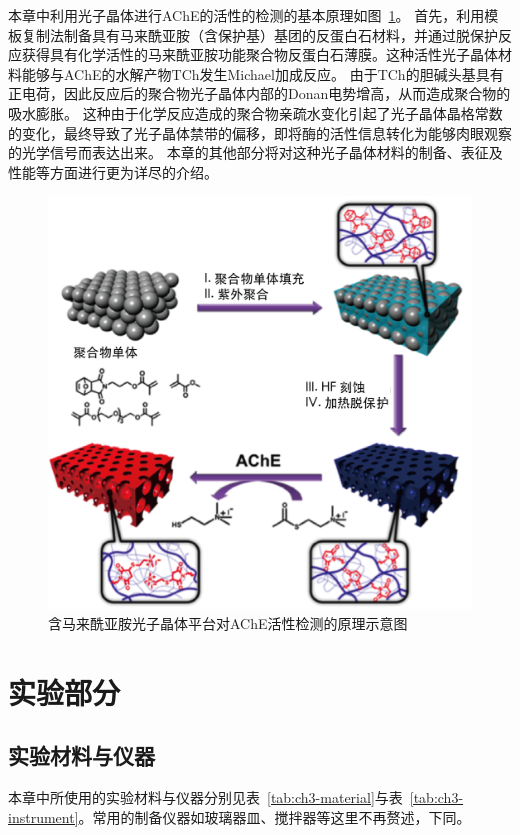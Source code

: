 本章中利用光子晶体进行AChE的活性的检测的基本原理如图~\ref{fig:maleimide-photonic-principle}。
首先，利用模板复制法制备具有马来酰亚胺（含保护基）基团的反蛋白石材料，并通过脱保护反应获得具有化学活性的马来酰亚胺功能聚合物反蛋白石薄膜。这种活性光子晶体材料能够与AChE的水解产物TCh发生Michael加成反应。
由于TCh的胆碱头基具有正电荷，因此反应后的聚合物光子晶体内部的Donan电势增高，从而造成聚合物的吸水膨胀。
这种由于化学反应造成的聚合物亲疏水变化引起了光子晶体晶格常数的变化，最终导致了光子晶体禁带的偏移，即将酶的活性信息转化为能够肉眼观察的光学信号而表达出来。
本章的其他部分将对这种光子晶体材料的制备、表征及性能等方面进行更为详尽的介绍。
\begin{figure}[htbp]
  \centering
  \includegraphics[width=0.85\linewidth]{figures/ch3/principle.png}
  \caption{含马来酰亚胺光子晶体平台对AChE活性检测的原理示意图}
  \label{fig:maleimide-photonic-principle}
\end{figure}

\section{实验部分}
\label{sec:ch3-exp}

\subsection{实验材料与仪器}
本章中所使用的实验材料与仪器分别见表~\ref{tab:ch3-material}与表~\ref{tab:ch3-instrument}。常用的制备仪器如玻璃器皿、搅拌器等这里不再赘述，下同。

